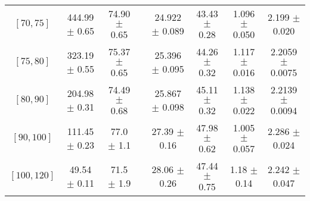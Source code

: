 \begin{tabular}{c||c|c|c|c|c|c|c}
$[70, 75]$ & 444.99 $\pm$ 0.65 & 74.90 $\pm$ 0.65 &  & 24.922 $\pm$ 0.089 & 43.43 $\pm$ 0.28 & 1.096 $\pm$ 0.050 & 2.199 $\pm$ 0.020\\
$[75, 80]$ & 323.19 $\pm$ 0.55 & 75.37 $\pm$ 0.65 &  & 25.396 $\pm$ 0.095 & 44.26 $\pm$ 0.32 & 1.117 $\pm$ 0.016 & 2.2059 $\pm$ 0.0075\\
$[80, 90]$ & 204.98 $\pm$ 0.31 & 74.49 $\pm$ 0.68 &  & 25.867 $\pm$ 0.098 & 45.11 $\pm$ 0.32 & 1.138 $\pm$ 0.022 & 2.2139 $\pm$ 0.0094\\
$[90, 100]$ & 111.45 $\pm$ 0.23 & 77.0 $\pm$ 1.1 &  & 27.39 $\pm$ 0.16 & 47.98 $\pm$ 0.62 & 1.005 $\pm$ 0.057 & 2.286 $\pm$ 0.024\\
$[100, 120]$ & 49.54 $\pm$ 0.11 & 71.5 $\pm$ 1.9 &  & 28.06 $\pm$ 0.26 & 47.44 $\pm$ 0.75 & 1.18 $\pm$ 0.14 & 2.242 $\pm$ 0.047\\
\end{tabular}

